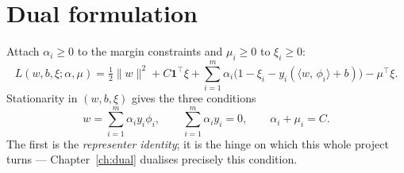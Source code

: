 \documentclass[11pt,a4paper]{report}
\newcommand{\one}{\mathbf{1}}
\newcommand{\inner}[2]{\langle #1,\, #2 \rangle}
\begin{document}
\section{Dual formulation}
Attach $\alpha_i\ge0$ to the margin constraints and $\mu_i\ge0$ to $\xi_i\ge0$:
\[
L(w,b,\xi;\alpha,\mu)=\tfrac12\|w\|^2+C\one^{\!\top}\xi
+\sum_{i=1}^m\alpha_i\bigl(1-\xi_i-y_i(\inner{w}{\phi_i}+b)\bigr)-\mu^{\!\top}\xi .
\]
Stationarity in $(w,b,\xi)$ gives the three conditions
\begin{equation}
\label{eq:representer}
w=\sum_{i=1}^m \alpha_i y_i \phi_i,
\qquad
\sum_{i=1}^m \alpha_i y_i = 0,
\qquad
\alpha_i+\mu_i=C .
\end{equation}
The first is the \emph{representer identity}; it is the hinge on which this whole
project turns --- Chapter~\ref{ch:dual} dualises precisely this condition.
\end{document}
